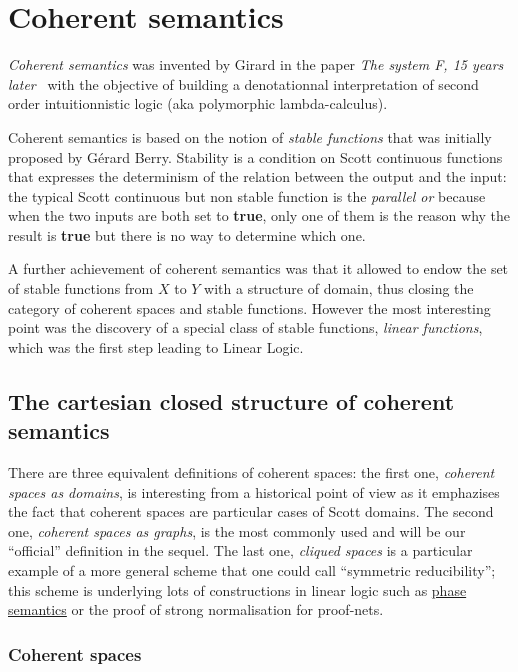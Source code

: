 \chapter{Coherent semantics}\label{coherent-semantics}

\emph{Coherent semantics} was invented by Girard in the paper \emph{The
system F, 15 years later}~\cite{systemF15} with the objective of building a
denotationnal interpretation of second order intuitionnistic logic (aka
polymorphic lambda-calculus).

Coherent semantics is based on the notion of \emph{stable functions}
that was initially proposed by Gérard Berry. Stability is a condition on
Scott continuous functions that expresses the determinism of the
relation between the output and the input: the typical Scott continuous
but non stable function is the \emph{parallel or} because when the two
inputs are both set to \textbf{true}, only one of them is the reason why
the result is \textbf{true} but there is no way to determine which one.

A further achievement of coherent semantics was that it allowed to endow
the set of stable functions from \(X\) to \(Y\) with a structure of
domain, thus closing the category of coherent spaces and stable
functions. However the most interesting point was the discovery of a
special class of stable functions, \emph{linear functions}, which was
the first step leading to Linear Logic.

\section{The cartesian closed structure of coherent semantics}\label{the-cartesian-closed-structure-of-coherent-semantics}

There are three equivalent definitions of coherent spaces: the first
one, \emph{coherent spaces as domains}, is interesting from a historical
point of view as it emphazises the fact that coherent spaces are
particular cases of Scott domains. The second one, \emph{coherent spaces
as graphs}, is the most commonly used and will be our ``official''
definition in the sequel. The last one, \emph{cliqued spaces} is a
particular example of a more general scheme that one could call
``symmetric reducibility''; this scheme is underlying lots of
constructions in linear logic such as \hyperref[phase-semantics]{phase
semantics} or the proof of strong normalisation for proof-nets.

\subsection{Coherent spaces}\label{coherent-spaces}

